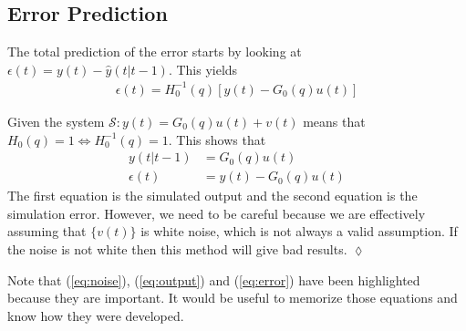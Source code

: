 \subsection{Error Prediction}
The total prediction of the error starts by looking at $\epsilon(t) = y(t)-\hat{y}(t|t-1)$.
This yields
\begin{align}
\label{eq:error}
\boxed{\epsilon(t) = H_0^{-1}(q)[y(t)-G_0(q)u(t)]}
\end{align}

\begin{example}
Given the system $\mathcal{S}:y(t)=G_0(q)u(t)+v(t)$ means that $H_0(q)=1\Leftrightarrow H_0^{-1}(q)=1$.
This shows that
\begin{align*}
y(t|t-1) &= G_0(q)u(t) \\
\epsilon(t) &= y(t) - G_0(q)u(t)
\end{align*}
The first equation is the simulated output and the second equation is the simulation error.
However, we need to be careful because we are effectively assuming that $\{v(t)\}$ is white noise, which is not always a valid assumption.
If the noise is not white then this method will give bad results.
$\lozenge$
\end{example}

Note that (\ref{eq:noise}), (\ref{eq:output}) and (\ref{eq:error}) have been highlighted because they are important.
It would be useful to memorize those equations and know how they were developed.%
